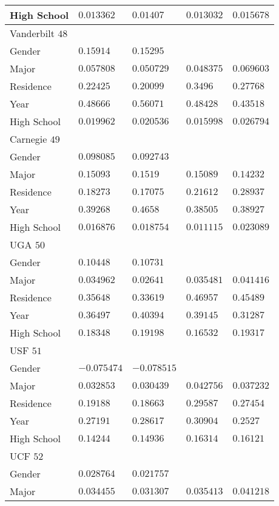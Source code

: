 \begin{center}
\begin{longtable}{|l|l|l|l|l|}
High School & $0.013362$ & $0.01407$ & $0.013032$ & $0.015678$ \\ \hline \hline
Vanderbilt $48$ & & &   \\ \hline
Gender & $0.15914$ & $0.15295$ & & \\
Major & $0.057808$ & $0.050729$ & $0.048375$ & $0.069603$ \\
Residence & $0.22425$ & $0.20099$ & $0.3496$ & $0.27768$ \\
Year & $0.48666$ & $0.56071$ & $0.48428$ & $0.43518$ \\
High School & $0.019962$ & $0.020536$ & $0.015998$ & $0.026794$ \\ \hline \hline
Carnegie $49$ & & &   \\ \hline
Gender & $0.098085$ & $0.092743$ & & \\
Major & $0.15093$ & $0.1519$ & $0.15089$ & $0.14232$ \\
Residence & $0.18273$ & $0.17075$ & $0.21612$ & $0.28937$ \\
Year & $0.39268$ & $0.4658$ & $0.38505$ & $0.38927$ \\
High School & $0.016876$ & $0.018754$ & $0.011115$ & $0.023089$ \\ \hline \hline
UGA $50$ & & &   \\ \hline
Gender & $0.10448$ & $0.10731$ & & \\
Major & $0.034962$ & $0.02641$ & $0.035481$ & $0.041416$ \\
Residence & $0.35648$ & $0.33619$ & $0.46957$ & $0.45489$ \\
Year & $0.36497$ & $0.40394$ & $0.39145$ & $0.31287$ \\
High School & $0.18348$ & $0.19198$ & $0.16532$ & $0.19317$ \\ \hline \hline
USF $51$ & & &   \\ \hline
Gender & $-0.075474$ & $-0.078515$ & & \\
Major & $0.032853$ & $0.030439$ & $0.042756$ & $0.037232$ \\
Residence & $0.19188$ & $0.18663$ & $0.29587$ & $0.27454$ \\
Year & $0.27191$ & $0.28617$ & $0.30904$ & $0.2527$ \\
High School & $0.14244$ & $0.14936$ & $0.16314$ & $0.16121$ \\ \hline \hline
UCF $52$ & & &   \\ \hline
Gender & $0.028764$ & $0.021757$ & & \\
Major & $0.034455$ & $0.031307$ & $0.035413$ & $0.041218$ \\

\end{longtable}
\end{center}
